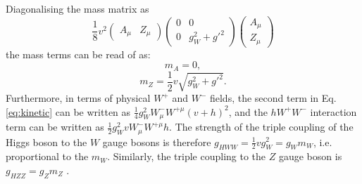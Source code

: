 Diagonalising the mass matrix as
\begin{equation}
\frac{1}{8} v^2
\begin{pmatrix}
A_\mu & Z_\mu
\end{pmatrix}
\begin{pmatrix}
0 & 0 \\
0 & g_W^2 + g'^2
\end{pmatrix}
\begin{pmatrix}
A_\mu \\
Z_\mu
\end{pmatrix}
\end{equation}
the mass terms can be read of as:
\begin{equation}
m_A = 0,
\end{equation}
\begin{equation}
m_Z = \frac{1}{2}v\sqrt{g_W^2 + g'^2}.
\end{equation}
Furthermore, in terms of physical $W^+$ and $W^-$ fields, the second term
in Eq. \ref{eq:kinetic} can be written as $\frac{1}{4} g_W^2 W_\mu^- W^{+\mu} (v+h)^2$,
and the $h W^+ W^-$ interaction term can be written as $\frac{1}{2} g_W^2 v W_\mu^- W^{+\mu} h$.
The strength of the triple coupling of the Higgs boson to the $W$ gauge bosons is therefore
$g_{HWW} = \frac{1}{2} v g_W^2 = g_W m_W$, i.e. proportional to the $m_W$. Similarly, the
triple coupling to the $Z$ gauge boson is $g_{HZZ} = g_Z m_Z$ \cite{Thomson:2013zua}.

